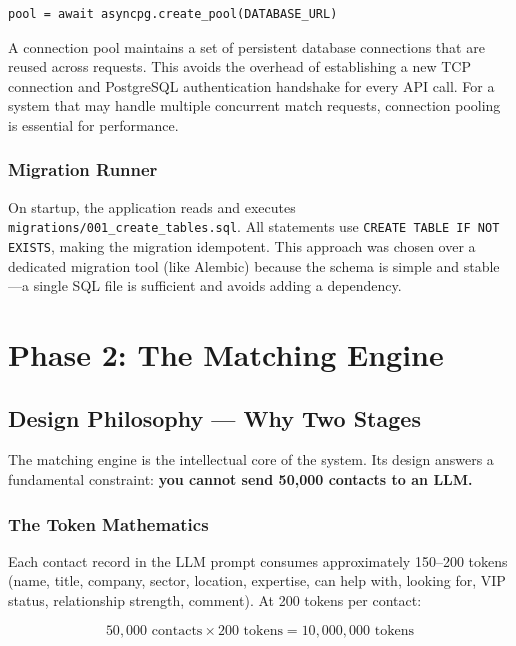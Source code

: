 \documentclass[12pt, a4paper]{report}
\begin{document}
\begin{lstlisting}[style=pythonstyle]
pool = await asyncpg.create_pool(DATABASE_URL)
\end{lstlisting}

A connection pool maintains a set of persistent database connections that are reused across requests. This avoids the overhead of establishing a new TCP connection and PostgreSQL authentication handshake for every API call. For a system that may handle multiple concurrent match requests, connection pooling is essential for performance.

\subsection{Migration Runner}

On startup, the application reads and executes \texttt{migrations/001\_create\_tables.sql}. All statements use \texttt{CREATE TABLE IF NOT EXISTS}, making the migration idempotent. This approach was chosen over a dedicated migration tool (like Alembic) because the schema is simple and stable---a single SQL file is sufficient and avoids adding a dependency.

\chapter{Phase 2: The Matching Engine}

\section{Design Philosophy --- Why Two Stages}

The matching engine is the intellectual core of the system. Its design answers a fundamental constraint: \textbf{you cannot send 50,000 contacts to an LLM.}

\subsection{The Token Mathematics}

Each contact record in the LLM prompt consumes approximately 150--200 tokens (name, title, company, sector, location, expertise, can help with, looking for, VIP status, relationship strength, comment). At 200 tokens per contact:

\[
50,000 \text{ contacts} \times 200 \text{ tokens} = 10,000,000 \text{ tokens}
\]
\end{document}
